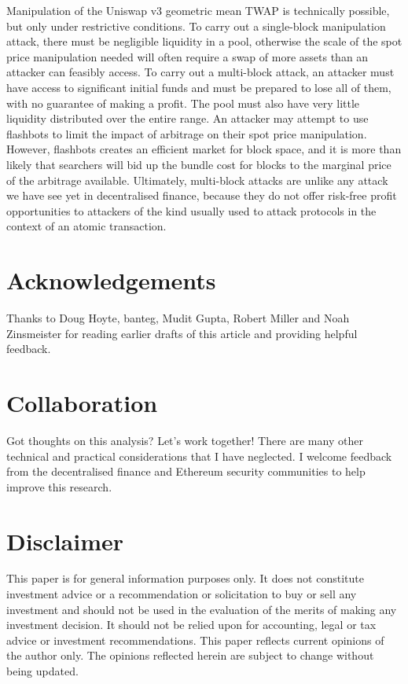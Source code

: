 \documentclass[a4paper, 11pt]{article}
\begin{document}
Manipulation of the Uniswap v3 geometric mean TWAP is technically possible, but only under restrictive conditions. To carry out a single-block manipulation attack, there must be negligible liquidity in a pool, otherwise the scale of the spot price manipulation needed will often require a swap of more assets than an attacker can feasibly access. To carry out a multi-block attack, an attacker must have access to significant initial funds and must be prepared to lose all of them, with no guarantee of making a profit. The pool must also have very little liquidity distributed over the entire range. An attacker may attempt to use flashbots to limit the impact of arbitrage on their spot price manipulation. However, flashbots creates an efficient market for block space, and it is more than likely that searchers will bid up the bundle cost for blocks to the marginal price of the arbitrage available. Ultimately, multi-block attacks are unlike any attack we have see yet in decentralised finance, because they do not offer risk-free profit opportunities to attackers of the kind usually used to attack protocols in the context of an atomic transaction. 

\section{Acknowledgements}

Thanks to Doug Hoyte, banteg, Mudit Gupta, Robert Miller and Noah Zinsmeister for reading earlier drafts of this article and providing helpful feedback. 

\section{Collaboration}

Got thoughts on this analysis? Let's work together! There are many other technical and practical considerations that I have neglected. I welcome feedback from the decentralised finance and Ethereum security communities to help improve this research.    

\section{Disclaimer}

This paper is for general information purposes only. It does not constitute investment advice or a recommendation or solicitation to buy or sell any investment and should not be used in the evaluation of the merits of making any investment decision. It should not be relied upon for accounting, legal or tax advice or investment recommendations. This paper reflects current opinions of the author only. The opinions reflected herein are subject to change without being updated.
\end{document}
